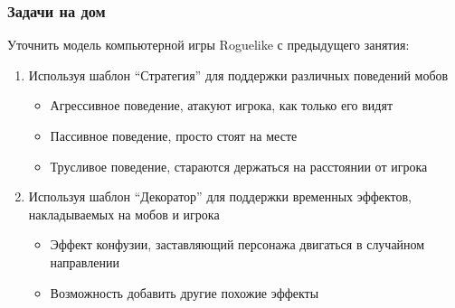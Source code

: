 \documentclass{../../slides-style}
\begin{document}
    \begin{frame}
        \frametitle{Задачи на дом}
        Уточнить модель компьютерной игры Roguelike с предыдущего занятия:

        \begin{enumerate}
            \item Используя шаблон ``Стратегия'' для поддержки различных поведений мобов
            \begin{itemize}
                \item Агрессивное поведение, атакуют игрока, как только его видят
                \item Пассивное поведение, просто стоят на месте
                \item Трусливое поведение, стараются держаться на расстоянии от игрока
            \end{itemize}
            \item Используя шаблон ``Декоратор'' для поддержки временных эффектов, накладываемых на мобов и игрока
            \begin{itemize}
                \item Эффект конфузии, заставляющий персонажа двигаться в случайном направлении
                \item Возможность добавить другие похожие эффекты
            \end{itemize}
        \end{enumerate}
    \end{frame}
\end{document}
